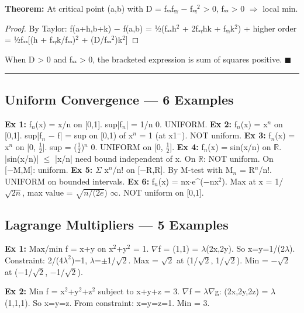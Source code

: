 \documentclass[12pt,a4paper,openany]{book}
\begin{document}
{{\begin{tcolorbox}[colback=lightblue,colframe=thmblue,title=\textbf{Theorem},breakable,boxrule=1.5pt]
\textbf{Theorem:} At critical point (a,b) with D = fₓₓfᵧᵧ − fₓᵧ$^2$ > 0, fₓₓ > 0 $\Longrightarrow$ local min.
\end{tcolorbox}

\begin{proof}
By Taylor: f(a+h,b+k) − f(a,b) = ½(fₓₓh$^2$ + 2fₓᵧhk + fᵧᵧk$^2$) + higher order
= ½fₓₓ[(h + fₓᵧk/fₓₓ)$^2$ + (D/fₓₓ$^2$)k$^2$]
\end{proof}

When D > 0 and fₓₓ > 0, the bracketed expression is sum of squares  positive. $\blacksquare$

\bigskip\noindent\rule{\textwidth}{0.4pt}\bigskip


\subsection{Uniform Convergence — 6 Examples}

\textbf{Ex 1:} f$_n$(x) = x/n on [0,1]. sup|f$_n$| = 1/n  0. UNIFORM. 
\textbf{Ex 2:} f$_n$(x) = x$^n$ on [0,1]. sup|f$_n$ − f| = sup on [0,1) of x$^n$ = 1 (at x1$^{-}$). NOT uniform.
\textbf{Ex 3:} f$_n$(x) = x$^n$ on [0, $\frac{1}{2}$]. sup = ($\frac{1}{2}$)$^n$  0. UNIFORM on [0, $\frac{1}{2}$]. 
\textbf{Ex 4:} f$_n$(x) = sin(x/n) on $\mathbb{R}$. |sin(x/n)| $\leq$ |x/n|  need bound independent of x. On $\mathbb{R}$: NOT uniform. On [−M,M]: uniform.
\textbf{Ex 5:} $\Sigma$ x$^n$/n! on [−R,R]. By M-test with M$_n$ = R$^n$/n!. UNIFORM on bounded intervals.
\textbf{Ex 6:} f$_n$(x) = nx$\cdot$e^(−nx$^2$). Max at x = 1/$\sqrt{2n}$, max value = $\sqrt{n/(2e}$)  $\infty$. NOT uniform on [0,1].

\subsection{Lagrange Multipliers — 5 Examples}

\textbf{Ex 1:} Max/min f = x+y on x$^2$+y$^2$ = 1.
$\nabla$f = (1,1) = $\lambda$(2x,2y). So x=y=1/(2$\lambda$). Constraint: 2/(4$\lambda^2$)=1, $\lambda$=$\pm$1/$\sqrt{2}$.
Max = $\sqrt{2}$ at (1/$\sqrt{2}$, 1/$\sqrt{2}$). Min = −$\sqrt{2}$ at (−1/$\sqrt{2}$, −1/$\sqrt{2}$).

\textbf{Ex 2:} Min f = x$^2$+y$^2$+z$^2$ subject to x+y+z = 3.
$\nabla$f = $\lambda\nabla$g: (2x,2y,2z) = $\lambda$(1,1,1). So x=y=z. From constraint: x=y=z=1. Min = 3.

}}
\end{document}
